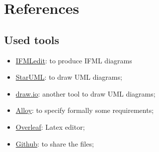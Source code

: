\documentclass{article}
\begin{document}
\section{References}
\subsection{Used tools}
\begin{itemize}
    \item \href{https://www.ifmledit.org

}{IFMLedit}: to produce IFML diagrams
\item \href{https://staruml.io/}{StarUML}: to draw UML diagrams;
    \item \href{https://app.diagrams.net/}{draw.io}: another tool to draw UML diagrams;
    \item \href{https://alloytools.org/}{Alloy}: to specify formally some requirements;
    \item \href{https://www.overleaf.com}{Overleaf}: Latex editor;
    \item \href{https://github.com/}{Github}: to share the files;
\end{itemize}
\end{document}
